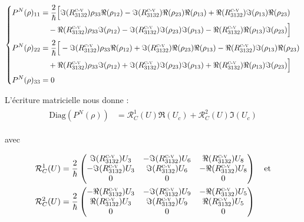 \documentclass[12pt,a4paper,openany,oneside]{book}
\begin{document}
{{{{{{ \begin{eqnarray*}
  \left\{
\begin{split}
P^{N}(\rho)_{11} &= \dfrac{2}{\hbar}\Big[\Im(R^{\textsc{c-v}}_{3132})\rho_{33}\Re(\rho_{12})-\Im(R^{\textsc{c-v}}_{3132})\Re(\rho_{23})\Re(\rho_{13})+\Re(R^{\textsc{c-v}}_{3132})\Im(\rho_{13})\Re(\rho_{23})\\
&\quad -\Re(R^{\textsc{c-v}}_{3132})\rho_{33}\Im(\rho_{12})-\Im(R^{\textsc{c-v}}_{3132})\Im(\rho_{23})\Im(\rho_{13})-\Re(R^{\textsc{c-v}}_{3132})\Re(\rho_{13})\Im(\rho_{23})\Big]\\
P^{N}(\rho)_{22} &= \dfrac{2}{\hbar}\Big[-\Im(R^{\textsc{c-v}}_{3132})\rho_{33}\Re(\rho_{12})+\Im(R^{\textsc{c-v}}_{3132})\Re(\rho_{23})\Re(\rho_{13})-\Re(R^{\textsc{c-v}}_{3132})\Im(\rho_{13})\Re(\rho_{23})\\
&\quad +\Re(R^{\textsc{c-v}}_{3132})\rho_{33}\Im(\rho_{12})+\Im(R^{\textsc{c-v}}_{3132})\Im(\rho_{23})\Im(\rho_{13})+\Re(R^{\textsc{c-v}}_{3132})\Re(\rho_{13})\Im(\rho_{23})\Big]\\
P^{N}(\rho)_{33} &= 0
\end{split}
\right.
 \end{eqnarray*}

 
 L'écriture matricielle nous donne : 
 \begin{eqnarray} \label{matrice des elts diagonaux de PN}
\begin{split}
\textrm{Diag}(P^{N}(\rho))&= \mathcal{R}^{1}_{C}(U)\Re(U_{c}) + \mathcal{R}^{2}_{C}(U)\Im(U_{c})
\end{split}
\end{eqnarray}

avec 

 \begin{eqnarray*}
 \begin{split}
\mathcal{R}^{1}_{C}(U) &= \dfrac{2}{\hbar}
\begin{pmatrix}
\Im(R^{\textsc{c-v}}_{3132})U_{3}& -\Im(R^{\textsc{c-v}}_{3132})U_{6} & \Re(R^{\textsc{c-v}}_{3132})U_{8}\\
-\Im(R^{\textsc{c-v}}_{3132})U_{3}& \Im(R^{\textsc{c-v}}_{3132})U_{6}& -\Re(R^{\textsc{c-v}}_{3132})U_{8}\\
            0 &                               0 & 0
\end{pmatrix} \quad \textrm{et} \\
\mathcal{R}^{2}_{C}(U) &= \dfrac{2}{\hbar}
\begin{pmatrix}
-\Re(R^{\textsc{c-v}}_{3132})U_{3} & -\Im(R^{\textsc{c-v}}_{3132})U_{9} & -\Re(R^{\textsc{c-v}}_{3132})U_{5}\\
\Re(R^{\textsc{c-v}}_{3132})U_{3} & \Im(R^{\textsc{c-v}}_{3132})U_{9} & \Re(R^{\textsc{c-v}}_{3132})U_{5}\\
            0 &                               0 & 0
\end{pmatrix}
\end{split}
\end{eqnarray*}\\
 
}}}}}}
\end{document}
